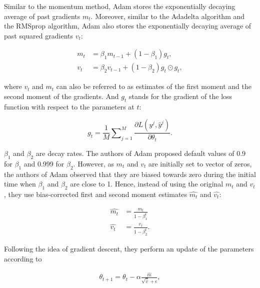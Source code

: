 \documentclass[
	parskip, 			   %
	twoside, 			   %
	DIV=14, 			   %
	BCOR=15.0mm, 		   %
	headsepline, 		   %
	open=right, 		   %
	captions=tableheading, %
	bibliography=totoc,    %
	numbers=noenddot       %
]{scrreprt}
\begin{document}
Similar to the momentum method, Adam stores the exponentially decaying average of past gradients $m_t$. Moreover, similar to the Adadelta algorithm \cite{zeiler2012adadelta} and the RMSprop algorithm, Adam also stores the exponentially decaying average of past squared gradients $v_t$:

\begin{equation}
    \label{eq:moment_estimate}
    \begin{aligned}
        m_t &= \beta_1 m_{t-1} + (1-\beta_1) g_{t},
        \\
        v_t &= \beta_2 v_{t-1} + (1-\beta_2) g_{t} \odot g_{t},
    \end{aligned}
\end{equation}

where $v_t$ and $m_t$ can also be referred to as estimates of the first moment and the second moment of the gradients. And $g_{t}$ stands for the gradient of the loss function with respect to the parameters at $t$:

\begin{equation}
    \label{eq:mean_gradient}
    g_{t} = \frac{1}{M} \sum\nolimits_{j=1}^M \frac{\partial L (y^j, \hat{y}^j)}{\partial \theta_{t}}.
\end{equation}

$\beta_1$ and $\beta_2$ are decay rates. The authors of Adam proposed default values of 0.9 for $\beta_1$ and 0.999 for $\beta_2$. However, as $m_t$ and $v_t$ are initially set to vector of zeros, the authors of Adam observed that they are biased towards zero during the initial time when $\beta_1$ and $\beta_2$ are close to 1. Hence, instead of using the original $m_t$ and $v_t$, they use bias-corrected first and second moment estimates $\hat{m_t}$ and $\hat{v_t}$:

\begin{equation}
    \label{eq:corrected_moment_estimate}
    \begin{aligned}
        \hat{m_t} &= \frac{m_t}{1-\beta_1^t}
        \\
        \hat{v_t} &= \frac{v_t}{1-\beta_2^t}.
    \end{aligned}
\end{equation}

Following the idea of gradient descent, they perform an update of the parameters according to

\begin{equation}
    \label{eq:Adam_GD}
    \begin{aligned}
        \theta_{t+1} = \theta_{t} - \alpha \frac{\hat{m}}{\sqrt{\hat{v}} + \epsilon},
    \end{aligned}
\end{equation}
\end{document}
